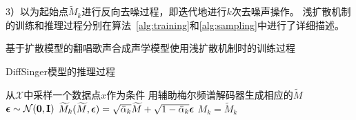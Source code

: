 3）以为起始点$\widetilde{M}_k$进行反向去噪过程，即迭代地进行$k$次去噪声操作。
浅扩散机制的训练和推理过程分别在算法~\ref{alg:training}和\ref{alg:sampling}中进行了详细描述。
\begin{algorithm}[!h]
\caption{基于扩散模型的翻唱歌声合成声学模型使用浅扩散机制时的训练过程}
\label{alg:training}
\end{algorithm}
\begin{algorithm}[!h]
\caption{DiffSinger模型的推理过程}
\label{alg:sampling}
    从$\mathcal{X}$中采样一个数据点$x$作为条件\;
    用辅助梅尔频谱解码器生成相应的$\widetilde{M}$\;
    ${\boldsymbol{\epsilon}}\sim\mathcal{N}(\mathbf{0},\mathbf{I})$\;
    $\widetilde{M}_k(\widetilde{M}, {\boldsymbol{\epsilon}}) = \sqrt{\bar\alpha_k}\widetilde{M} + \sqrt{1-\bar\alpha_k}{\boldsymbol{\epsilon}}$\;
    $M_k =  \widetilde{M}_k$\;
\end{algorithm}
